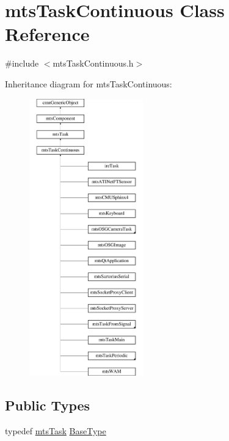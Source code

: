 \hypertarget{classmts_task_continuous}{}\section{mts\+Task\+Continuous Class Reference}
\label{classmts_task_continuous}


{\ttfamily \#include $<$mts\+Task\+Continuous.\+h$>$}

Inheritance diagram for mts\+Task\+Continuous\+:\begin{figure}[H]
\begin{center}
\leavevmode
\includegraphics[height=12.000000cm]{d2/d8b/classmts_task_continuous}
\end{center}
\end{figure}
\subsection*{Public Types}
\begin{DoxyCompactItemize}
\item 
typedef \hyperlink{classmts_task}{mts\+Task} \hyperlink{classmts_task_continuous_ab1c75a7d5ac83cba5bc21ebd4a31d804}{Base\+Type}
\end{DoxyCompactItemize}
